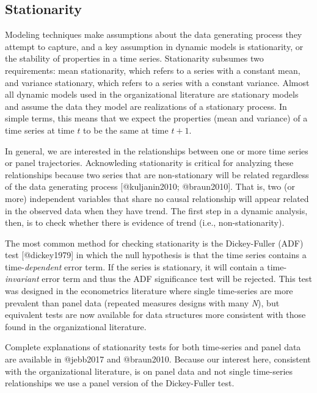 \documentclass[]{article}
\begin{document}
\hypertarget{stationarity}{%
\subsection{Stationarity}\label{stationarity}}

Modeling techniques make assumptions about the data generating process
they attempt to capture, and a key assumption in dynamic models is
stationarity, or the stability of properties in a time series.
Stationarity subsumes two requirements: mean stationarity, which refers
to a series with a constant mean, and variance stationary, which refers
to a series with a constant variance. Almost all dynamic models used in
the organizational literature are stationary models and assume the data
they model are realizations of a stationary process. In simple terms,
this means that we expect the properties (mean and variance) of a time
series at time \(t\) to be the same at time \(t+1\).

In general, we are interested in the relationships between one or more
time series or panel trajectories. Acknowleding stationarity is critical
for analyzing these relationships because two series that are
non-stationary will be related regardless of the data generating process
{[}@kuljanin2010; @braun2010{]}. That is, two (or more) independent
variables that share no causal relationship will appear related in the
observed data when they have trend. The first step in a dynamic
analysis, then, is to check whether there is evidence of trend (i.e.,
non-stationarity).

The most common method for checking stationarity is the Dickey-Fuller
(ADF) test {[}@dickey1979{]} in which the null hypothesis is that the
time series contains a time-\emph{dependent} error term. If the series
is stationary, it will contain a time-\emph{invariant} error term and
thus the ADF significance test will be rejected. This test was designed
in the econometrics literature where single time-series are more
prevalent than panel data (repeated measures designs with many
\emph{N}), but equivalent tests are now available for data structures
more consistent with those found in the organizational literature.

Complete explanations of stationarity tests for both time-series and
panel data are available in @jebb2017 and @braun2010. Because our
interest here, consistent with the organizational literature, is on
panel data and not single time-series relationships we use a panel
version of the Dickey-Fuller test.
\end{document}

